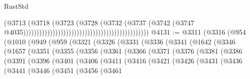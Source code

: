 \begin{lexlean}{RustStd}
\begin{coremodule}
                                                                                  (@3713
                                                                                    (@3718
                                                                                      (@3723
                                                                                        (@3728
                                                                                          (@3732
                                                                                            (@3737
                                                                                              (@3742
                                                                                                (@3747
                                                                                                  @4035)))))))))))))))))))))))))))))))))))))))))))))))
@4131 := @3311
    (@3316
      (@954
        (@1010
          (@949
            (@959
              (@3321
                (@3326
                  (@3331
                    (@3336
                      (@3341
                        (@1642
                          (@3346
                            (@1657
                              (@3351
                                (@3355
                                  (@3356
                                    (@3361
                                      (@3366
                                        (@3371
                                          (@3376
                                            (@3381
                                              (@3386
                                                (@3391
                                                  (@3396
                                                    (@3401
                                                      (@3406
                                                        (@3411
                                                          (@3416
                                                            (@3421
                                                              (@3426
                                                                (@3431
                                                                  (@3436
                                                                    (@3441
                                                                      (@3446
                                                                        (@3451
                                                                          (@3456
                                                                            (@3461

\end{coremodule}
\end{lexlean}
